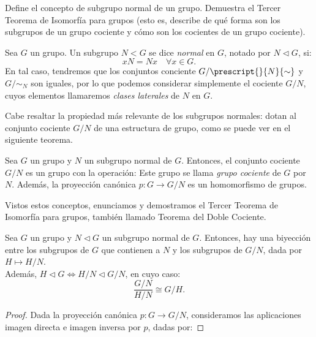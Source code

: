 

\begin{ejercicio}
    Define el concepto de subgrupo normal de un grupo. Demuestra el Tercer Teorema de Isomorfía para grupos (esto es, describe de qué forma son los subgrupos de un grupo cociente y cómo son los cocientes de un grupo cociente).
    \begin{definicion}
        Sea \(G\) un grupo. Un subgrupo \(N<G\) se dice \emph{normal} en $G$, notado por $N\lhd G$, si:
        \begin{equation*}
            xN = Nx \quad \forall x \in G.
        \end{equation*}
        En tal caso, tendremos que los conjuntos conciente $G/\prescript{}{N}{\sim}$ y $G/{\sim}_{N}$ son iguales, por lo que podemos considerar simplemente el cociente \(G/N\), cuyos elementos llamaremos \emph{clases laterales} de \(N\) en \(G\).
    \end{definicion}

    Cabe resaltar la propiedad más relevante de los subgrupos normales: dotan al conjunto cociente \(G/N\) de una estructura de grupo, como se puede ver en el siguiente teorema.
    \begin{teo}
        Sea \(G\) un grupo y \(N\) un subgrupo normal de \(G\). Entonces, el conjunto cociente \(G/N\) es un grupo con la operación:
        Este grupo se llama \emph{grupo cociente} de \(G\) por \(N\). Además, la proyección canónica \(p: G \to G/N\) es un homomorfismo de grupos.
    \end{teo}

    Vistos estos conceptos, enunciamos y demostramos el Tercer Teorema de Isomorfía para grupos, también llamado Teorema del Doble Cociente.
    \begin{teo}
        Sea \(G\) un grupo y \(N\lhd G\) un subgrupo normal de \(G\). Entonces, hay una biyección entre los subgrupos de $G$ que contienen a \(N\) y los subgrupos de \(G/N\), dada por $H\mapsto H/N$.\\

        Además, $H\lhd G\iff H/N\lhd G/N$, en cuyo caso:
        \begin{equation*}
            \frac{G/N}{H/N} \cong G/H.
        \end{equation*}
        \begin{proof}
            Dada la proyección canónica \(p: G \to G/N\), consideramos las aplicaciones imagen directa e imagen inversa por $p$, dadas por:


\end{proof}
\end{teo}
\end{ejercicio}
